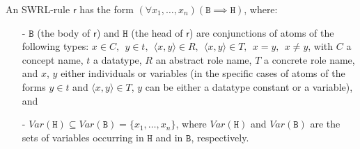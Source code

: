 \documentclass[a4paper]{llncs}
\begin{document}
An SWRL-rule $\mathsf{r}$ has the form $(\forall x_1,\ldots,x_n) ( \mathtt{B}  \implies \mathtt{H})$, where:
 \begin{itemize}
 \item[-]  $\mathtt{B}$ (the body of $\mathsf{r}$) and $\mathtt{H}$ (the head of $\mathsf{r}$) are conjunctions of atoms of the following types: $x \in C,~~y \in t,~~\langle x,y \rangle \in R,~~\langle x,y \rangle \in T,~~x=y,~~x \neq y$,
with $C$ a concept name, $t$ a datatype, $R$ an abstract role name, $T$ a concrete role name, and $x$, $y$ either individuals or variables (in the specific cases of atoms of the forms $y \in t$ and $\langle x,y \rangle \in T$, $y$ can be either a datatype constant or a variable), and

\newcommand{\Var}{\textit{Var}}
\item[-]
$\Var(\mathtt{H}) \subseteq \Var(\mathtt{B})=\{x_1,\ldots,x_n\}$, where $\Var(\mathtt{H})$ and $\Var(\mathtt{B})$ are the sets of variables occurring in $\mathtt{H}$ and in $\mathtt{B}$, respectively.
 \end{itemize}
\end{document}
